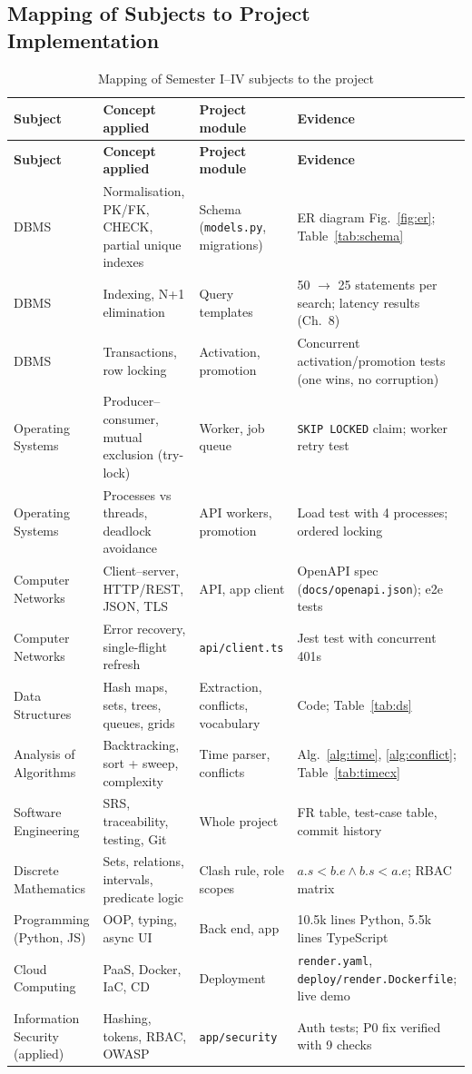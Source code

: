 \subsection{Mapping of Subjects to Project Implementation}
\begin{longtable}{@{}p{2.2cm}p{4cm}p{3.6cm}p{5.1cm}@{}}
\caption{Mapping of Semester I--IV subjects to the project}\label{tab:mapping}\\
\toprule
\textbf{Subject} & \textbf{Concept applied} & \textbf{Project module} & \textbf{Evidence}\\
\midrule
\endfirsthead
\toprule
\textbf{Subject} & \textbf{Concept applied} & \textbf{Project module} & \textbf{Evidence}\\
\midrule
\endhead
DBMS & Normalisation, PK/FK, CHECK, partial unique indexes & Schema (\texttt{models.py}, migrations) & ER diagram Fig.~\ref{fig:er}; Table~\ref{tab:schema}\\
DBMS & Indexing, N+1 elimination & Query templates & 50 $\rightarrow$ 25 statements per search; latency results (Ch.~8)\\
DBMS & Transactions, row locking & Activation, promotion & Concurrent activation/promotion tests (one wins, no corruption)\\
Operating Systems & Producer--consumer, mutual exclusion (try-lock) & Worker, job queue & \texttt{SKIP LOCKED} claim; worker retry test\\
Operating Systems & Processes vs threads, deadlock avoidance & API workers, promotion & Load test with 4 processes; ordered locking\\
Computer Networks & Client--server, HTTP/REST, JSON, TLS & API, app client & OpenAPI spec (\texttt{docs/openapi.json}); e2e tests\\
Computer Networks & Error recovery, single-flight refresh & \texttt{api/client.ts} & Jest test with concurrent 401s\\
Data Structures & Hash maps, sets, trees, queues, grids & Extraction, conflicts, vocabulary & Code; Table~\ref{tab:ds}\\
Analysis of Algorithms & Backtracking, sort + sweep, complexity & Time parser, conflicts & Alg.~\ref{alg:time}, \ref{alg:conflict}; Table~\ref{tab:timecx}\\
Software Engineering & SRS, traceability, testing, Git & Whole project & FR table, test-case table, commit history\\
Discrete Mathematics & Sets, relations, intervals, predicate logic & Clash rule, role scopes & $a.s<b.e \wedge b.s<a.e$; RBAC matrix\\
Programming (Python, JS) & OOP, typing, async UI & Back end, app & 10.5k lines Python, 5.5k lines TypeScript\\
Cloud Computing & PaaS, Docker, IaC, CD & Deployment & \texttt{render.yaml}, \texttt{deploy/render.Dockerfile}; live demo\\
Information Security (applied) & Hashing, tokens, RBAC, OWASP & \texttt{app/security} & Auth tests; P0 fix verified with 9 checks\\
\bottomrule
\end{longtable}

\newpage
